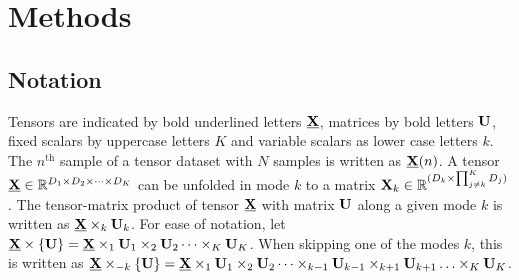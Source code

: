 \documentclass[twocolumn]{article}
\begin{document}
\section{Methods}

\subsection{Notation}
Tensors are indicated by bold underlined letters $\ten{X}$, matrices by bold
letters $\mat{U}$, fixed scalars by uppercase letters $K$ and variable
scalars as lower case letters $k$.
The $n^\text{th}$ sample of a tensor dataset with $N$ samples is written as
$\ten{X}(n)$.
A tensor $\ten{X}\in \mathbb{R}^{D_1\times D_2 \times \cdots \times D_K}$ can be unfolded in mode
$k$ to a matrix $\mat{X}_k\in\mathbb{R}^{(D_k\times\prod_{j\neq k}^K D_j)}$.
The tensor-matrix product of tensor $\ten{X}$ with matrix $\mat{U}$ along a
given mode $k$ is written as $\ten{X}\mpr{\mat{U}}{k}$. For ease of notation, let
$\ten{X}\mmpr{\mat{U}} =
	\ten{X}\mpr{\mat{U}}{1}\mpr{\mat{U}}{2}\cdots\mpr{\mat{U}}{K}$.
When skipping one of the modes $k$, this is
written as $\ten{X}\mmprs{\mat{U}}{k} =
	\ten{X}\mpr{\mat{U}}{1}\mpr{\mat{U}}{2}\cdots\mpr{\mat{U}}{k-1}\mpr{\mat{U}}{k+1}\ldots\mpr{\mat{U}}{K}$.
\end{document}
